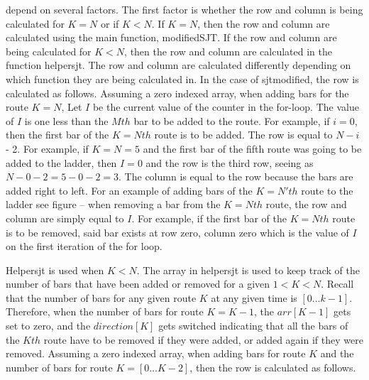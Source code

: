 depend on several factors. The first factor is whether the row and column is being calculated for $K=N$ or 
if $K < N$. If $K=N$, then the row and column are calculated using the main function, modifiedSJT.
If the row and column are being calculated for $K < N$, then the  row and column are calculated in the 
function helpersjt. The row and column are calculated differently depending on which function they are 
being calculated in. In the case of sjtmodified, the row is calculated as follows. Assuming a zero indexed array,  when adding bars 
for the route $K=N$, Let $I$ be the current 
value of the counter in the for-loop. The value of $I$ is one less than the $Mth$ bar to 
be added to the route. For example, if $i=0$, then the first bar of the $K=Nth$ route is
to be added. The row is equal to $N-i$ - 2. For example, if $K=N=5$ and the first bar of the 
fifth route was going to be added to the ladder, then $I=0$ and the row is the third row, seeing 
as $N-0-2=5-0-2=3$. The column is equal to the row because the bars are added right to left. 
For an example of adding bars of the $K=N'th$ route to the ladder see figure -- 
when removing a bar from the $K=Nth$ route, the row and column are simply equal to $I$. 
For example, if the first bar of the $K=Nth$ route is to be removed, said bar exists at 
row zero, column zero which is the value of $I$ on the first iteration of the for loop.\par 
Helpersjt is used when $K<N$. The array in helpersjt is used to keep track of the number of bars
that have been added or removed for a given $1< K <N$. Recall that the number of bars for any given route 
$K$ at any given time is $[0 \dots k-1]$. Therefore, when the number of bars for route $K=K-1$, 
the $arr[K-1]$  gets set to zero, and the $direction[K]$ gets switched indicating that all the bars of the 
$Kth$ route have to be removed if they were added, or added again if they were removed. Assuming a zero indexed 
array, when adding bars for route $K$ and the number of bars for route $K=[0 \dots K-2]$, then the row is calculated 
as follows. 

